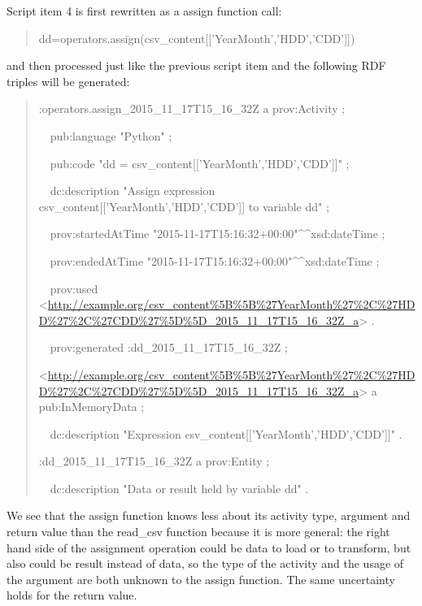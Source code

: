 Script item 4 is first rewritten as a assign function call:
\begin{quotation}
	\noindent dd=operators.assign(csv\_content[['YearMonth','HDD','CDD']])
\end{quotation}
and then processed just like the previous script item and the following RDF triples will be generated:
\begin{quotation}
	\noindent:operators.assign\_2015\_11\_17T15\_16\_32Z a prov:Activity ;
	
	\noindent \ \ pub:language "Python" ;
	
	\noindent \ \ pub:code "dd = csv\_content[['YearMonth','HDD','CDD']]" ;
	
	\noindent \ \ dc:description "Assign expression csv\_content[['YearMonth','HDD','CDD']] to variable dd" ;
	
	\noindent \ \ prov:startedAtTime "2015-11-17T15:16:32+00:00"\^{}\^{}xsd:dateTime ;
	
	\noindent \ \ prov:endedAtTime "2015-11-17T15:16:32+00:00"\^{}\^{}xsd:dateTime ;
	
	\noindent \ \ prov:used <\url{http://example.org/csv_content%5B%5B%27YearMonth%27%2C%27HDD%27%2C%27CDD%27%5D%5D_2015_11_17T15_16_32Z_a}> .
		
	\noindent \ \ prov:generated :dd\_2015\_11\_17T15\_16\_32Z ;
	
	\noindent<\url{http://example.org/csv_content%5B%5B%27YearMonth%27%2C%27HDD%27%2C%27CDD%27%5D%5D_2015_11_17T15_16_32Z_a}> a pub:InMemoryData ;
		
	\noindent\ \ dc:description "Expression csv\_content[['YearMonth','HDD','CDD']]" .

	\noindent:dd\_2015\_11\_17T15\_16\_32Z a prov:Entity ;

	\noindent\ \ dc:description "Data or result held by variable dd" .
\end{quotation}
We see that the assign function knows less about its activity type, argument and return value than the read\_csv function because it is more general: the right hand side of the assignment operation could be data to load or to transform, but also could be result instead of data, so the type of the activity and the usage of the argument are both unknown to the assign function. The same uncertainty holds for the return value.

